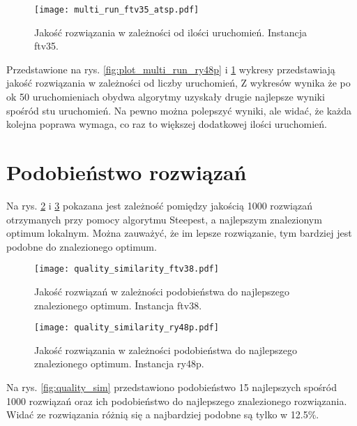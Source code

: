 \documentclass{article}
\begin{document}
\begin{figure}
    \begin{center}
        \texttt{[image: multi\_run\_ftv35\_atsp.pdf]}
    \end{center}
    \caption{Jakość rozwiązania w zależności od ilości uruchomień. Instancja ftv35.}
    \label{fig:plot_multi_run_ftv35}
\end{figure}

Przedstawione na rys. \ref{fig:plot_multi_run_ry48p} i \ref{fig:plot_multi_run_ftv35}  wykresy przedstawiają jakość rozwiązania w zależności od liczby uruchomień, Z wykresów wynika że po ok 50 uruchomieniach obydwa algorytmy uzyskały drugie najlepsze wyniki spośród stu uruchomień. Na pewno można polepszyć wyniki, ale widać, że każda kolejna poprawa wymaga, co raz to większej dodatkowej ilości uruchomień. 

\section{Podobieństwo rozwiązań}

Na rys. \ref{fig:quality_sim_ftv38} i \ref{fig:quality_sim_ry48p} pokazana jest zależność pomiędzy jakością 1000 rozwiązań otrzymanych przy pomocy algorytmu Steepest, a najlepszym znalezionym optimum lokalnym. Można zauważyć, że im lepsze rozwiązanie, tym bardziej jest podobne do znalezionego optimum.

\begin{figure}
    \begin{center}
        \texttt{[image: quality\_similarity\_ftv38.pdf]}
    \end{center}
    \caption{Jakość rozwiązań w zależności podobieństwa do najlepszego znalezionego optimum. Instancja ftv38.}
    \label{fig:quality_sim_ftv38}
\end{figure}

\begin{figure}
    \begin{center}
        \texttt{[image: quality\_similarity\_ry48p.pdf]}
    \end{center}
    \caption{Jakość rozwiązania w zależności podobieństwa do najlepszego znalezionego optimum. Instancja ry48p.}
    \label{fig:quality_sim_ry48p}
\end{figure}


Na rys. \ref{fig:quality_sim} przedstawiono podobieństwo 15 najlepszych spośród 1000 rozwiązań oraz ich podobieństwo do najlepszego znalezionego rozwiązania. Widać ze rozwiązania różnią się a najbardziej podobne są tylko w 12.5\%.
\end{document}
